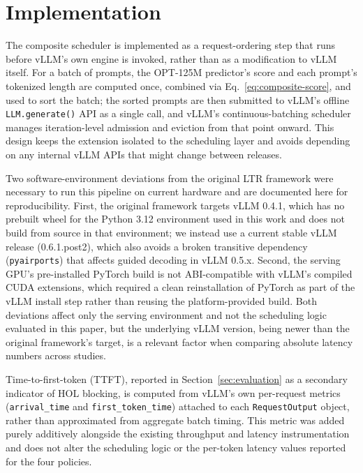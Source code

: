 \section{Implementation}
\label{sec:implementation}

The composite scheduler is implemented as a request-ordering step that runs
before vLLM's own engine is invoked, rather than as a modification to vLLM
itself. For a batch of prompts, the OPT-125M predictor's score and each
prompt's tokenized length are computed once, combined via
Eq.~\eqref{eq:composite-score}, and used to sort the batch; the sorted
prompts are then submitted to vLLM's offline \texttt{LLM.generate()} API as a
single call, and vLLM's continuous-batching scheduler manages iteration-level
admission and eviction from that point onward. This design keeps the
extension isolated to the scheduling layer and avoids depending on any
internal vLLM APIs that might change between releases.

Two software-environment deviations from the original LTR framework were
necessary to run this pipeline on current hardware and are documented here for
reproducibility. First, the original framework targets vLLM 0.4.1, which has
no prebuilt wheel for the Python 3.12 environment used in this work and does
not build from source in that environment; we instead use a current stable
vLLM release (0.6.1.post2), which also avoids a broken transitive dependency
(\texttt{pyairports}) that affects guided decoding in vLLM 0.5.x. Second, the
serving GPU's pre-installed PyTorch build is not ABI-compatible with vLLM's
compiled CUDA extensions, which required a clean reinstallation of PyTorch as
part of the vLLM install step rather than reusing the platform-provided build.
Both deviations affect only the serving environment and not the scheduling
logic evaluated in this paper, but the underlying vLLM version, being newer
than the original framework's target, is a relevant factor when comparing
absolute latency numbers across studies.

Time-to-first-token (TTFT), reported in Section~\ref{sec:evaluation} as a
secondary indicator of HOL blocking, is computed from vLLM's own per-request
metrics (\texttt{arrival\_time} and \texttt{first\_token\_time}) attached to
each \texttt{RequestOutput} object, rather than approximated from aggregate
batch timing. This metric was added purely additively alongside the existing
throughput and latency instrumentation and does not alter the scheduling
logic or the per-token latency values reported for the four policies.

